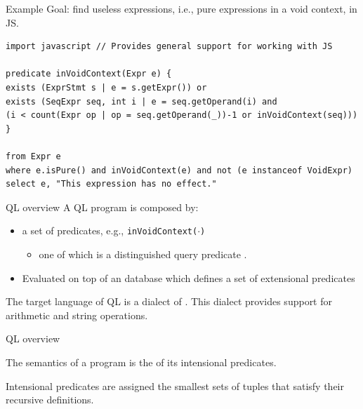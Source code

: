 \documentclass[usenames,dvipsnames]{beamer}
\begin{document}
\begin{frame}[fragile]{Example}
Goal: find useless expressions, i.e., pure expressions in a void context, in JS.
\begin{lstlisting}[language=JastAdd]
import javascript // Provides general support for working with JS

predicate inVoidContext(Expr e) {
exists (ExprStmt s | e = s.getExpr()) or
exists (SeqExpr seq, int i | e = seq.getOperand(i) and
(i < count(Expr op | op = seq.getOperand(_))-1 or inVoidContext(seq)))
}

from Expr e
where e.isPure() and inVoidContext(e) and not (e instanceof VoidExpr)
select e, "This expression has no effect."
\end{lstlisting}
\end{frame}

\begin{frame}{QL overview}
A QL program is composed by:
\begin{itemize}
\item a set of  predicates, e.g., \texttt{inVoidContext($\cdot$)}
\begin{itemize}
\item one of which is a distinguished query predicate .
\end{itemize}
\item Evaluated on top of an  database which defines a set of extensional predicates
\end{itemize}
The target language of QL is a dialect of . This dialect provides support for arithmetic and string operations.
\end{frame}

\begin{frame}{QL overview}
\begin{center}
The semantics of a program is the  of its intensional predicates.
\vspace{1cm}

Intensional predicates are assigned the smallest sets of tuples that satisfy their recursive definitions.
\end{center}
\end{frame}
\end{document}
